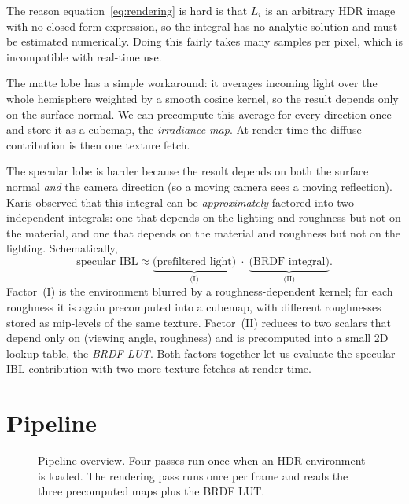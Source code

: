 \documentclass{egpubl}
\begin{document}
The reason equation~\eqref{eq:rendering} is hard is that $L_i$ is an arbitrary
HDR image with no closed-form expression, so the integral has no analytic
solution and must be estimated numerically. Doing this fairly takes many
samples per pixel, which is incompatible with real-time use.

The matte lobe has a simple workaround: it averages incoming light over the
whole hemisphere weighted by a smooth cosine kernel, so the result depends
only on the surface normal. We can precompute this average for every direction
once and store it as a cubemap, the \emph{irradiance map}. At render time the
diffuse contribution is then one texture fetch.

The specular lobe is harder because the result depends on both the surface
normal \emph{and} the camera direction (so a moving camera sees a moving
reflection). Karis observed that this integral can be \emph{approximately}
factored into two independent integrals: one that depends on the lighting and
roughness but not on the material, and one that depends on the material and
roughness but not on the lighting. Schematically,
\begin{equation}
\text{specular IBL} \approx \underbrace{\text{(prefiltered light)}}_{\text{(I)}}
\;\cdot\; \underbrace{\text{(BRDF integral)}}_{\text{(II)}}.
\label{eq:split}
\end{equation}
Factor~(I) is the environment blurred by a roughness-dependent kernel; for
each roughness it is again precomputed into a cubemap, with different
roughnesses stored as mip-levels of the same texture. Factor~(II) reduces to
two scalars that depend only on (viewing angle, roughness) and is
precomputed into a small 2D lookup table, the \emph{BRDF LUT}. Both factors
together let us evaluate the specular IBL contribution with two more texture
fetches at render time.

\section{Pipeline}\label{sec:pipeline}

\begin{figure}[t]
\centering
{}
\caption{Pipeline overview. Four passes run once when an HDR environment is
loaded. The rendering pass runs once per frame and reads the three precomputed
maps plus the BRDF LUT.}
\label{fig:pipeline}
\end{figure}
\end{document}
